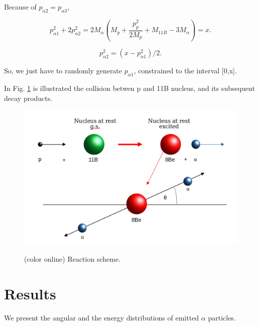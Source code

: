 \documentclass[aps,prc,twocolumn,floatfix,showpacs,a4paper,
nofootinbib,amsmath,amssymb]{revtex4}
\newcommand{\be}{\begin{equation}}
\newcommand{\ee}{\end{equation}}
\begin{document}
Because of $p_{\alpha2} = p_{\alpha3}$,

\be
p_{\alpha1}^2 + 2p_{\alpha2}^2 = 2M_{\alpha}\left(M_p + \frac{p_p^2}{2M_p} + M_{11B} - 3M_{\alpha}\right) = x.
\ee

\be
p_{\alpha2}^2 = (x - p_{\alpha1}^2) / 2.
\ee

So, we just have to randomly generate $p_{\alpha1}$, constrained to the interval [0,x].
 
In Fig. \ref{Reaction} is illustrated the collision betwen p and 11B nucleus, and its subsequent decay products.

\begin{figure}[h]
	\begin{center}
		\resizebox{0.98\columnwidth}{!}
		{\includegraphics{reaction_scheme.png}}
		\caption{ (color online)
			Reaction scheme.
		}
		\label{Reaction}
	\end{center}
\end{figure} 



\section{Results}

We present the angular and the energy distributions of emitted $\alpha$ particles.
\end{document}
